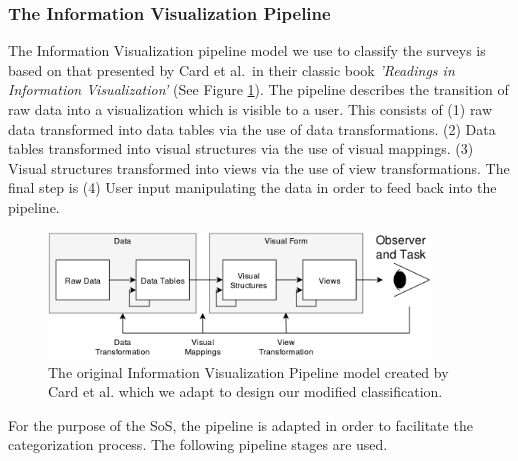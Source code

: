 \subsubsection{The Information Visualization Pipeline} \label{sec:infovispip}
The Information Visualization pipeline model we use to classify the surveys is based on that presented by Card et al.\ in their classic book \textit{'Readings in Information Visualization'} \cite{card1999readings} (See Figure \ref{fig: originalPipeline}). The pipeline describes the transition of raw data into a visualization which is visible to a user. This consists of (1) raw data transformed into data tables via the use of data transformations. (2) Data tables transformed into visual structures via the use of visual mappings. (3) Visual structures transformed into views via the use of view transformations. The final step is (4) User input manipulating the data in order to feed back into the pipeline.
\begin{figure}
\begin{center}
\includegraphics[width=0.9\textwidth]{images/customPipeline}
\caption{The original Information Visualization Pipeline model created by Card et al. \cite{card1999readings} which we adapt to design our modified classification.} \label{fig: originalPipeline}
\end{center}
\end{figure}
For the purpose of the SoS, the pipeline is adapted in order to facilitate the categorization process.
The following pipeline stages are used.
